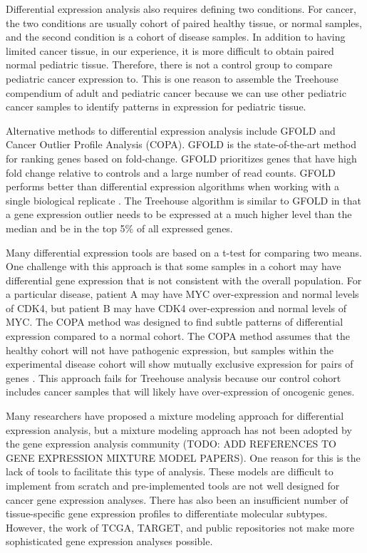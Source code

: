 \documentclass[fleqn,10pt]{wlscirep}
\begin{document}
Differential expression analysis also requires defining two conditions. For cancer, the two conditions are usually cohort of paired healthy tissue, or normal samples, and the second condition is a cohort of disease samples. In addition to having limited cancer tissue, in our experience, it is more difficult to obtain paired normal pediatric tissue. Therefore, there is not a control group to compare pediatric cancer expression to. This is one reason to assemble the Treehouse compendium of adult and pediatric cancer because we can use other pediatric cancer samples to identify patterns in expression for pediatric tissue.

Alternative methods to differential expression analysis include GFOLD and Cancer Outlier Profile Analysis (COPA). GFOLD is the state-of-the-art method for ranking genes based on fold-change. GFOLD prioritizes genes that have high fold change relative to controls and a large number of read counts. GFOLD performs better than differential expression algorithms when working with a single biological replicate \cite{feng2012gfold}. The Treehouse algorithm is similar to GFOLD in that a gene expression outlier needs to be expressed at a much higher level than the median and be in the top 5\% of all expressed genes.

Many differential expression tools are based on a t-test for comparing two means. One challenge with this approach is that some samples in a cohort may have differential gene expression that is not consistent with the overall population. For a particular disease, patient A may have MYC over-expression and normal levels of CDK4, but patient B may have CDK4 over-expression and normal levels of MYC. The COPA method was designed to find subtle patterns of differential expression compared to a normal cohort. The COPA method assumes that the healthy cohort will not have pathogenic expression, but samples within the experimental disease cohort will show mutually exclusive expression for pairs of genes \cite{macdonald2006copa,wang2012mcopa}. This approach fails for Treehouse analysis because our control cohort includes cancer samples that will likely have over-expression of oncogenic genes.

Many researchers have proposed a mixture modeling approach for differential expression analysis, but a mixture modeling approach has not been adopted by the gene expression analysis community (TODO: ADD REFERENCES TO GENE EXPRESSION MIXTURE MODEL PAPERS). One reason for this is the lack of tools to facilitate this type of analysis. These models are difficult to implement from scratch and pre-implemented tools are not well designed for cancer gene expression analyses. There has also been an insufficient number of tissue-specific gene expression profiles to differentiate molecular subtypes. However, the work of TCGA, TARGET, and public repositories not make more sophisticated gene expression analyses possible. 
\end{document}
